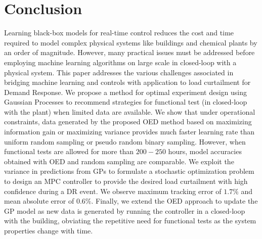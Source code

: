 \section{Conclusion}

Learning black-box models for real-time control reduces the cost and time required to model complex physical systems like buildings and chemical plants by an order of magnitude. 
However, many practical issues must be addressed before employing machine learning algorithms on large scale in closed-loop with a physical system.
This paper addresses the various challenges associated in bridging machine learning and controls with application to load curtailment for Demand Response.
We propose a method for optimal experiment design using Gaussian Processes to recommend strategies for functional test (in closed-loop with the plant) when limited data are available. 
We show that under operational constraints, data generated by the proposed OED method based on maximizing information gain or maximizing variance provides much faster learning rate than uniform random sampling or pseudo random binary sampling. 
However, when functional tests are allowed for more than \(200-250\) hours, model accuracies obtained with OED and random sampling are comparable.
We exploit the variance in predictions from GPs to formulate a stochastic optimization problem to design an MPC controller to provide the desired load curtailment with high confidence during a DR event. 
We observe maximum tracking error of \(1.7\%\) and mean absolute error of \(0.6\%\). 
Finally, we extend the OED approach to update the GP model as new data is generated by running the controller in a closed-loop with the building, obviating the repetitive need for functional tests as the system properties change with time.


